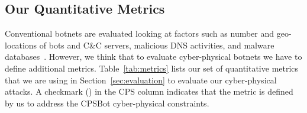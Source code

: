 \documentclass[sigconf]{acmart}
\makeatletter
\newcommand{\Botnet}{CPSBot\@\xspace}
\newcommand{\CC}{C\&C\@\xspace}
\newcommand{\cmark}{\ding{51}}%
\makeatother
\begin{document}

\subsection{Our Quantitative Metrics}
\label{sec:metrics}

Conventional botnets are evaluated looking at factors such as number
and geo-locations of bots and \CC servers, malicious DNS activities, and malware
databases~\cite{nadji2013beheading,stone2011analysis}. However, we think that
to evaluate cyber-physical botnets we have to define additional
metrics. Table~\ref{tab:metrics} lists our set of quantitative metrics
that we are using in Section~\ref{sec:evaluation} to evaluate our
cyber-physical attacks. A checkmark (\cmark) in the CPS column indicates that the
metric is defined by us to address the \Botnet cyber-physical constraints.

\end{document}
